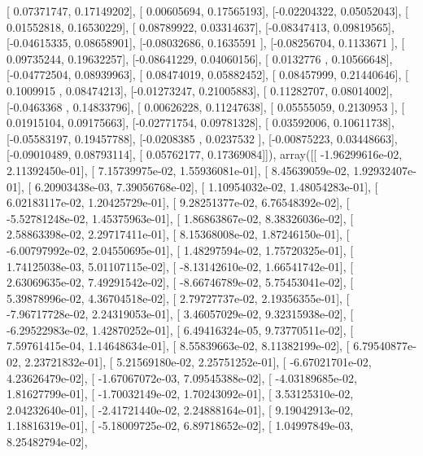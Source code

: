 \documentclass{article}
\begin{document}
       [ 0.07371747,  0.17149202],
       [ 0.00605694,  0.17565193],
       [-0.02204322,  0.05052043],
       [ 0.01552818,  0.16530229],
       [ 0.08789922,  0.03314637],
       [-0.08347413,  0.09819565],
       [-0.04615335,  0.08658901],
       [-0.08032686,  0.1635591 ],
       [-0.08256704,  0.1133671 ],
       [ 0.09735244,  0.19632257],
       [-0.08641229,  0.04060156],
       [ 0.0132776 ,  0.10566648],
       [-0.04772504,  0.08939963],
       [ 0.08474019,  0.05882452],
       [ 0.08457999,  0.21440646],
       [ 0.1009915 ,  0.08474213],
       [-0.01273247,  0.21005883],
       [ 0.11282707,  0.08014002],
       [-0.0463368 ,  0.14833796],
       [ 0.00626228,  0.11247638],
       [ 0.05555059,  0.2130953 ],
       [ 0.01915104,  0.09175663],
       [-0.02771754,  0.09781328],
       [ 0.03592006,  0.10611738],
       [-0.05583197,  0.19457788],
       [-0.0208385 ,  0.0237532 ],
       [-0.00875223,  0.03448663],
       [-0.09010489,  0.08793114],
       [ 0.05762177,  0.17369084]]), array([[ -1.96299616e-02,   2.11392450e-01],
       [  7.15739975e-02,   1.55936081e-01],
       [  8.45639059e-02,   1.92932407e-01],
       [  6.20903438e-03,   7.39056768e-02],
       [  1.10954032e-02,   1.48054283e-01],
       [  6.02183117e-02,   1.20425729e-01],
       [  9.28251377e-02,   6.76548392e-02],
       [ -5.52781248e-02,   1.45375963e-01],
       [  1.86863867e-02,   8.38326036e-02],
       [  2.58863398e-02,   2.29717411e-01],
       [  8.15368008e-02,   1.87246150e-01],
       [ -6.00797992e-02,   2.04550695e-01],
       [  1.48297594e-02,   1.75720325e-01],
       [  1.74125038e-03,   5.01107115e-02],
       [ -8.13142610e-02,   1.66541742e-01],
       [  2.63069635e-02,   7.49291542e-02],
       [ -8.66746789e-02,   5.75453041e-02],
       [  5.39878996e-02,   4.36704518e-02],
       [  2.79727737e-02,   2.19356355e-01],
       [ -7.96717728e-02,   2.24319053e-01],
       [  3.46057029e-02,   9.32315938e-02],
       [ -6.29522983e-02,   1.42870252e-01],
       [  6.49416324e-05,   9.73770511e-02],
       [  7.59761415e-04,   1.14648634e-01],
       [  8.55839663e-02,   8.11382199e-02],
       [  6.79540877e-02,   2.23721832e-01],
       [  5.21569180e-02,   2.25751252e-01],
       [ -6.67021701e-02,   4.23626479e-02],
       [ -1.67067072e-03,   7.09545388e-02],
       [ -4.03189685e-02,   1.81627799e-01],
       [ -1.70032149e-02,   1.70243092e-01],
       [  3.53125310e-02,   2.04232640e-01],
       [ -2.41721440e-02,   2.24888164e-01],
       [  9.19042913e-02,   1.18816319e-01],
       [ -5.18009725e-02,   6.89718652e-02],
       [  1.04997849e-03,   8.25482794e-02],
\end{document}
